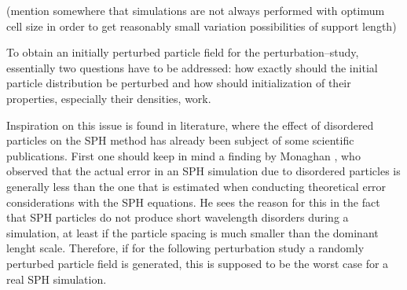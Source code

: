 \documentclass{report}
\begin{document}
(mention somewhere that simulations are not always performed with optimum cell size in order to get reasonably small variation possibilities of support length)
\linebreak                                                                                                                                   
 \linebreak                                                                                                                                   
                                                                                                                                              
 To obtain an initially perturbed particle field for the perturbation--study, essentially two questions have to be addressed: how exactly should the initial particle distribution be perturbed and how should initialization of their properties, especially their densities, work.         
                                                                                                                                              
 Inspiration on this issue is found in literature, where the effect of disordered particles on the SPH method has already been subject of some scientific publications.                                                                                                                      
 First one should keep in mind a finding by Monaghan \cite{Monaghan2005}, who observed that the actual error in an SPH simulation due to disordered particles is generally less than the one that is estimated when conducting theoretical error considerations with the SPH equations. He sees the reason for this in the fact that SPH particles do not produce short wavelength disorders during a simulation, at least if the particle spacing is much smaller than the dominant lenght scale. Therefore, if for the following perturbation study a randomly perturbed particle field is generated, this is supposed to be the worst case for a real SPH simulation.                                                                  
                                                                                                                                              
\end{document}
